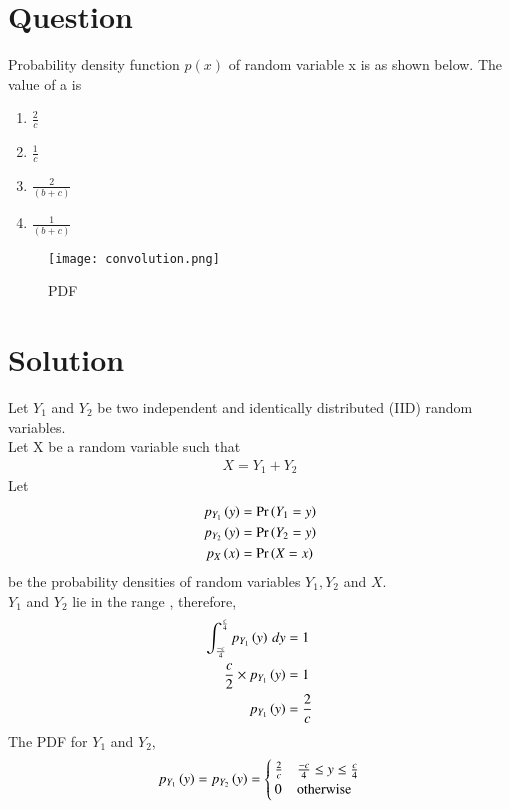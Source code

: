 \documentclass[journal,12pt,twocolumn]{IEEEtran}
\begin{document}
\section*{Question}
Probability density function $p(x)$ of random variable x is as shown below. The value of a is
\begin{enumerate}[label=\Alph*)]
    \item $\frac{2}{c}$
    \item $\frac{1}{c}$
    \item $\frac{2}{(b+c)}$
    \item $\frac{1}{(b+c)}$
\end{enumerate}
\begin{figure}[h!]
\centering
\texttt{[image: convolution.png]}
\caption{PDF}
\label{fig:BSC}
\end{figure}
\section*{Solution}

Let $Y_1$ and $Y_2$ be two independent and identically distributed (IID) random variables.\\
Let X be a random variable such that
\begin{align}
    X = Y_1 + Y_2
\end{align}
Let
\begin{align}
    p_{Y_1}\left(y\right) &= \Pr\left(Y_1=y\right) \\
    p_{Y_2}\left(y\right) &= \Pr\left(Y_2=y\right) \\
    p_X\left(x\right) &= \Pr\left(X=x\right)
\end{align}
be the probability densities of random variables $Y_1, Y_2$ and $X$. \\
$Y_1$ and $Y_2$ lie in the range , therefore,
\begin{align}
    \int_{\frac{-c}{4}}^{\frac{c}{4}} p_{Y_1}\left(y\right) \,dy  &=1 \\
    \frac{c}{2} \times p_{Y_1}\left(y\right)  &= 1 \\
     p_{Y_1}\left(y\right) &= \frac{2}{c}
\end{align}
The PDF for $Y_1$ and $Y_2$,
\begin{align}
p_{Y_1}\left(y\right) = p_{Y_2}\left(y\right) = 
\begin{cases}
\frac{2}{c} &  \frac{-c}{4} \le y \le \frac{c}{4}\\
0 & \text{otherwise}
\end{cases}
\end{align}
\end{document}
